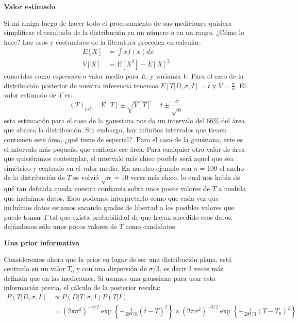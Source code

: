 \documentclass[aps,onecolumn,12pt,notitlepage]{revtex4-1}
\begin{document}
\textbf{Valor estimado}

Si mi amiga luego de hacer todo el procesamiento de sus mediciones quisiera simplificar el resultado de la distribución en un número o en un rango. ¿Cómo lo hace? 
Los usos y costumbres de la literatura proceden en calcular: 
\begin{align}
E[X] &= \int x f(x) dx \\
V[X] &= E[X^2] - E[X]^2
\end{align}
conocidas como \textit{esperanza} o valor medio para $E$, y varianza $V$. Para el caso de la distribución posterior de nuestra inferencia tenemos $E[T|D,\sigma,I]= \bar{t}$ y $V = \frac{\sigma}{n}$. El valor estimado de $T$ es:
\begin{equation}
(T)_{est} = E[T] \pm \sqrt{V[T]} = \bar{t} \pm \frac{\sigma}{\sqrt{n}}
\end{equation}
esta estimación para el caso de la gaussiana nos da un intervalo del $66\%$ del área que abarca la distribución. Sin embargo, hay infinitos intervalos que tienen contienen este área, ¿qué tiene de especial?. Para el caso de la gaussiana, este es el intervalo más pequeño que contiene ese área. Para cualquier otro valor de área que quisiéramos contemplar, el intervalo más chico posible será aquel que sea simétrico y centrado en el valor medio. 
En nuestro ejemplo con $n = 100$ el ancho de la distribución de $T$ se volvió $\sqrt{n} = 10$ veces más chico, lo cual nos habla de qué tan definida queda nuestra confianza sobre unos pocos valores de $T$ a medida que incluímos datos. Esto podemos interpretarlo como que cada vez que incluímos datos estamos sacando grados de libertad a los posibles valores que puede tomar $T$ tal que exista probabilidad de que hayan sucedido esos datos, dejándonos sólo unos pocos valores de $T$ como candidatos.

\textbf{Una prior informativa}

Consideremos ahora que la prior en lugar de ser una distribución plana, está centrada en un valor $T_0$ y con una dispersión de $\sigma/3$, es decir 3 veces más definida que en las mediciones. Si usamos una gaussiana para usar esta información previa, el cálculo de la posterior resulta:
\begin{equation}
\begin{aligned}
P(T|D,\sigma,I) & \propto P(D|T,\sigma,I)P(T|I) \\&= \left(2\pi\sigma^2\right)^{-n/2}\exp\left\{-\frac{1}{2\sigma^{2}/n}(\bar{t}-T)^2\right\} \times \left(2\pi\sigma^2\right)^{-3/2}\exp\left\{-\frac{1}{2\sigma^{2}/3}(T-T_{0})^2\right\}
\end{aligned}
\end{equation}
\end{document}
